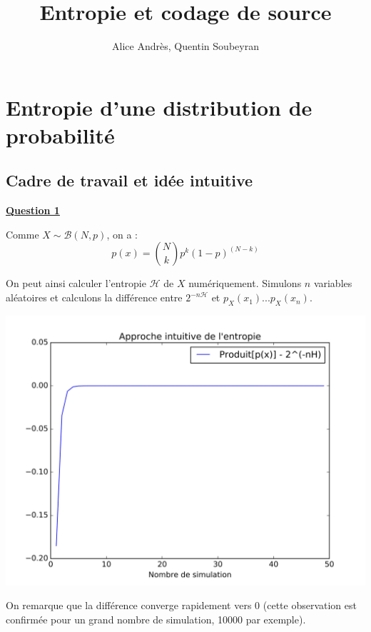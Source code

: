 \documentclass[a4paper,twoside,10pt]{article}
\title{Entropie et codage de source}
\author{Alice Andrès, Quentin Soubeyran}
\renewcommand{\H}{\mathcal{H}}
\newcommand{\B}{\mathcal{B}}
\newenvironment{Q}[1]{%
\vspace{1ex}
\underline{\textbf{Question #1\\}}
\newline
}{
\vspace{2ex}
}
\begin{document}
\maketitle

\section{Entropie d'une distribution de probabilité}

\subsection{Cadre de travail et idée intuitive}
\begin{Q}{1}
Comme $X \sim \B(N,p)$, on a :
\[
p(x) = {N \choose k} p^k (1-p)^{(N-k)}
\]

On peut ainsi calculer l'entropie $\H$ de $X$ numériquement. Simulons $n$ variables aléatoires et calculons la différence entre $2^{-n\H}$ et $p_X(x_1)...p_X(x_n)$.

\begin{center}
\includegraphics[width=\textwidth]{Q1.jpg}
\end{center}

On remarque que la différence converge rapidement vers 0 (cette observation est confirmée pour un grand nombre de simulation, 10000 par exemple).


\end{Q}
\end{document}
